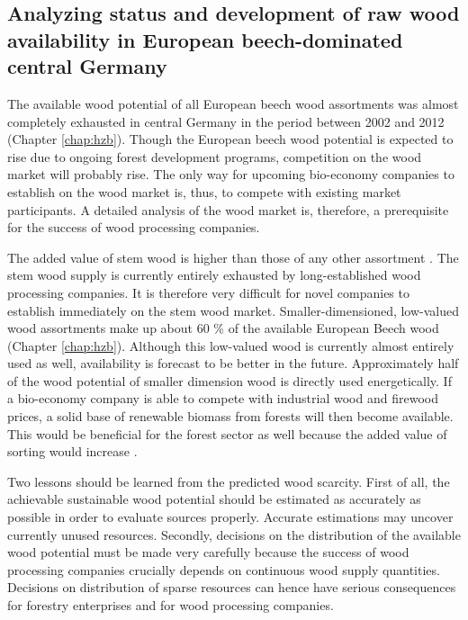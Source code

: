 \subsection{Analyzing status and development of raw wood availability in European beech-dominated central Germany}
\label{subsec:discussion:struct:hzb}
The available wood potential of all European beech wood assortments was almost completely exhausted in central Germany in the period between 2002 and 2012 (Chapter \ref{chap:hzb}). Though the European beech wood potential is expected to rise due to ongoing forest development programs, competition on the wood market will probably rise. The only way for upcoming bio-economy companies to establish on the wood market is, thus, to compete with existing market participants. A detailed analysis of the wood market is, therefore, a prerequisite for the success of wood processing companies.

The added value of stem wood is higher than those of any other assortment \citep{nagel_2008}. The stem wood supply is currently entirely exhausted by long-established wood processing companies. It is therefore very difficult for novel companies to establish immediately on the stem wood market. Smaller-dimensioned, low-valued wood assortments make up about 60 \% of the available European Beech wood (Chapter \ref{chap:hzb}). Although this low-valued wood is currently almost entirely used as well, availability is forecast to be better in the future. Approximately half of the wood potential of smaller dimension wood is directly used energetically. If a bio-economy company is able to compete with industrial wood and firewood prices, a solid base of renewable biomass from forests will then become available. This would be beneficial for the forest sector as well because the added value of sorting would increase \cite[p. 67]{mohring_1997}.

Two lessons should be learned from the predicted wood scarcity. First of all, the achievable sustainable wood potential should be estimated as accurately as possible in order to evaluate sources properly. Accurate estimations may uncover currently unused resources. Secondly, decisions on the distribution of the available wood potential must be made very carefully because the success of wood processing companies crucially depends on continuous wood supply quantities. Decisions on distribution of sparse resources can hence have serious consequences for forestry enterprises and for wood processing companies.

